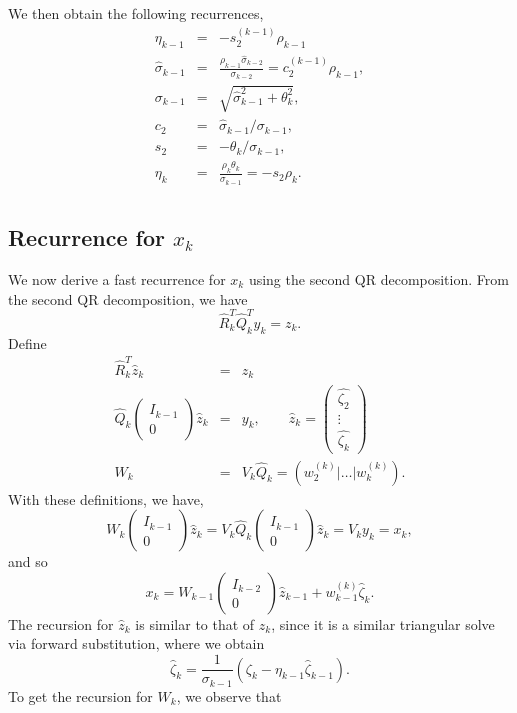 \documentclass[11pt]{article}
\newcommand{\Ik}{\begin{pmatrix} I_{k-1} \\ 0\end{pmatrix}}
\newcommand{\hQ}{\hat{Q}}
\begin{document}
We then obtain the following recurrences,
\begin{eqnarray}
\eta_{k-1} &=& -s^{(k-1)}_2 \rho_{k-1} \\
\hat{\sigma}_{k-1} &=& \frac{\rho_{k-1}\hat{\sigma}_{k-2}}{\sigma_{k-2}} = c^{(k-1)}_2\rho_{k-1}, \\
\sigma_{k-1} &=& \sqrt{\hat{\sigma}^2_{k-1} + \theta^2_k }, \\
c_2 &=& \hat{\sigma}_{k-1}/\sigma_{k-1}, \\
s_2 &=& -\theta_k/\sigma_{k-1}, \\
\eta_k &=& \frac{\rho_k\theta_k}{\sigma_{k-1}} = -s_2\rho_k. \\
\end{eqnarray}

\subsection{Recurrence for $x_k$}
We now derive a fast recurrence for $x_k$ using the second QR decomposition. From the second QR decomposition, we have
\begin{equation*}
\hat{R}^T_k \hQ^T_k y_k = z_k.
\end{equation*}
Define
\begin{eqnarray}
\hat{R}^T_k \hat{z}_k &=& z_k \\
\label{yzhat} \hQ_k \Ik \hat{z}_k &=& y_k, \qquad \hat{z}_k = \begin{pmatrix} \hat{\zeta_2} \\ \vdots \\ \hat{\zeta_k} \end{pmatrix}  \\
W_k &=& V_k \hQ_k = (w^{(k)}_2 | \dots | w^{(k)}_{k}).
\end{eqnarray}
With these definitions, we have,
$$ W_k \Ik \hat{z}_k = V_k \hQ_k \Ik \hat{z}_k = V_k y_k = x_k,  $$
and so
$$ x_k = W_{k-1} \begin{pmatrix} I_{k-2} \\ 0\end{pmatrix} \hat{z}_{k-1} + w^{(k)}_{k-1} \hat{\zeta}_k. $$
The recursion for $\hat{z}_k$ is similar to that of $z_k$, since it is a similar triangular solve via forward substitution, where we obtain
\begin{equation}
\hat{\zeta}_k = \frac{1}{\sigma_{k-1}} ( \zeta_k - \eta_{k-1} \hat{\zeta}_{k-1} ).
\end{equation}
To get the recursion for $W_k$, we observe that
\end{document}
